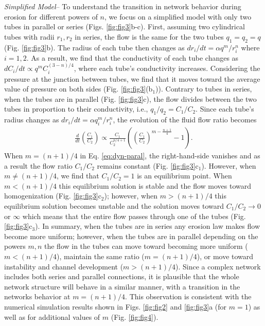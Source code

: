 \documentclass[%
reprint,
 amsmath,amssymb,
 aps,
prl,
]{revtex4-1}
\begin{document}
\textit{Simplified Model}-- {To understand the transition in network behavior during erosion for different powers of $n$, we focus on a simplified model with only two tubes in parallel or series (Figs. \ref{fig:fig3}b-c). First, assuming two cylindrical tubes with radii $r_1,r_2$ in series, the flow is the same for the two tubes $ q_1 = q_2 = q$ (Fig. \ref{fig:fig3}b). The radius of each tube then changes as $dr_i/dt = \alpha q^m /r_i^n$ where $i=1,2$. 
As a result, we find that the conductivity of each tube changes as $dC_i/dt \propto q^m C_i^{(3-n)/4}$, where each tube's conductivity increases. Considering the pressure at the junction between tubes, we find that it moves toward the average value of pressure on both sides (Fig. \ref{fig:fig3}(b$_1$)). Contrary to tubes in series, when the tubes are in parallel (Fig. \ref{fig:fig3}c), the flow divides between the two tubes in proportion to their conductivity, i.e., $q_1/q_2 = C_1/C_2$. Since each tube's radius changes as $dr_i/dt = \alpha q^m_i/r_i^n$, the evolution of the fluid flow ratio becomes 
\begin{align}
\frac{d}{dt}\left( \frac{C_1}{C_2}\right) \propto  \frac{C_1}{C^{n/4+1}_2} \left( \left( \frac{C_1}{C_2}\right)^{m-\frac{n+1}{4}} - 1 \right). \label{eq:dyn-paral}
\end{align}
When $m=(n+1)/4$ in Eq. \eqref{eq:dyn-paral}, the right-hand-side vanishes and as a result the flow ratio $C_1/C_2$ remains constant (Fig. \ref{fig:fig3}c$_1$). However, when $m \neq (n+1)/4$, we find that $C_1/C_2 = 1$ is an equilibrium point. When $m<(n+1)/4$ this equilibrium solution is stable and the flow moves toward homogenization (Fig. \ref{fig:fig3}c$_2$); however, when $m>(n+1)/4$ this equilibrium solution becomes unstable and the solution moves toward $C_1/C_2 \to 0$ or $\infty$ which means that the entire flow passes through one of the tubes (Fig. \ref{fig:fig3}c$_3$). In summary, when the tubes are in series any erosion law makes flow become more uniform; however, when the tubes are in parallel depending on the powers $m,n$ the flow in the tubes can move toward becoming more uniform ($m<(n+1)/4$), maintain the same ratio ($m=(n+1)/4$), or move toward instability and channel development ($m>(n+1)/4$). Since a complex network includes both series and parallel connections, it is plausible that the whole network structure will behave in a similar manner, with a transition in the networks behavior at $ m = (n+1)/4 $.
This observation  is consistent with the numerical simulation results shown in Figs. \ref{fig:fig2} and \ref{fig:fig3}a (for $m=1$) as well as for additional values of $m$ (Fig. \ref{fig:fig4}).}
%
\end{document}
